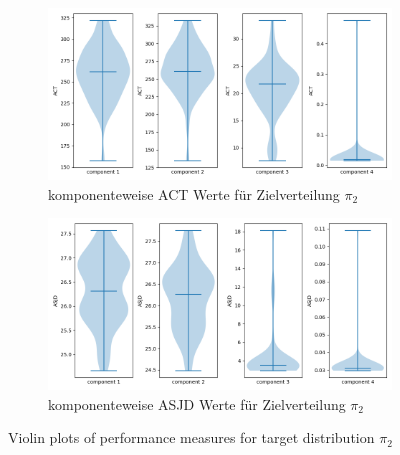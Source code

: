 \documentclass{scrartcl}
\begin{document}
    \begin{figure}
        \centering
        \begin{subfigure}{0.45\textheight}
              \centering
              \includegraphics[width=.8\linewidth]{../figs/ACT_pi_2.png}
              \caption{komponenteweise ACT Werte für Zielverteilung $\pi_2$}
              \label{violin_plots_pi_2_act}
        \end{subfigure}
        \begin{subfigure}{0.45\textheight}
              \centering
              \includegraphics[width=.8\linewidth]{../figs/ASJD_pi_2.png}
              \caption{komponenteweise ASJD Werte für Zielverteilung $\pi_2$}
              \label{violin_plots_pi_2_asjd}
        \end{subfigure}
        \caption{Violin plots of performance measures for target distribution $\pi_2$}
        \label{violin_plots_pi_2}
    \end{figure}
\end{document}
